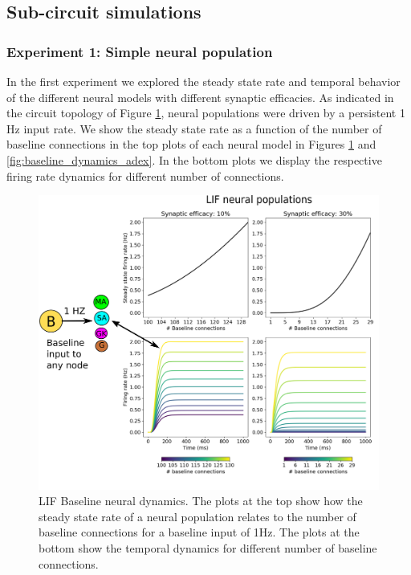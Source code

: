 \documentclass[10pt]{article}
\begin{document}
{\label{765620}}

\subsection{Sub-circuit simulations}

{\label{152250}}

\subsubsection{Experiment 1: Simple neural population}

{\label{461536}}

In the first experiment we explored the steady state rate and temporal behavior of the different neural models with different synaptic efficacies.
As indicated in the circuit topology of Figure \ref{fig:baseline_dynamics_lif}, neural populations were driven by a persistent 1 Hz input rate.
We show the steady state rate as a function of the number of baseline connections in the top plots of each neural model in Figures \ref{fig:baseline_dynamics_lif} and \ref{fig:baseline_dynamics_adex}.
In the bottom plots we display the respective firing rate dynamics for different number of connections.


\begin{figure}[h!]
  \begin{center}
    \includegraphics[width=1.00\columnwidth]{figures/baseline_dynamics_lif.png}
    \caption{LIF Baseline neural dynamics.
      The plots at the top show how the steady state rate of a neural population relates to the number of baseline connections for a baseline input of 1Hz.
      The plots at the bottom show the temporal dynamics for different number of baseline connections.}
    \label{fig:baseline_dynamics_lif}

  \end{center}
\end{figure}
\end{document}
